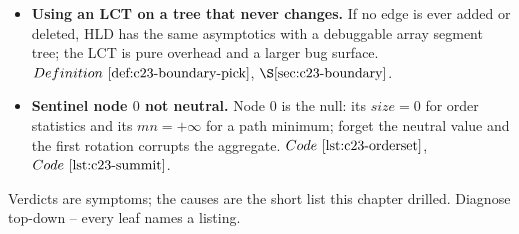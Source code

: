 \begin{itemize}[nosep, leftmargin=1.4em]
        \(\mathit{ch}[x][1]\); after the re-point the demoted child's value is unreachable, so a
        late read returns garbage. \(\thmref{c23-vsum}\), \(\coderef{c23-subtree}\).
  \item \textbf{Using an LCT on a tree that never changes.} If no edge is ever added or deleted,
        HLD has the same asymptotics with a debuggable array segment tree; the LCT is pure
        overhead and a larger bug surface. \(\defref{c23-boundary-pick}\), \(\secref{c23-boundary}\).
  \item \textbf{Sentinel node \(0\) not neutral.} Node \(0\) is the null: its \(\mathit{size}=0\)
        for order statistics and its \(\mathit{mn}=+\infty\) for a path minimum; forget the
        neutral value and the first rotation corrupts the aggregate. \(\coderef{c23-orderset}\), \(\coderef{c23-summit}\).
\end{itemize}


Verdicts are symptoms; the causes are the short list this chapter drilled. Diagnose top-down --
every leaf names a listing.

